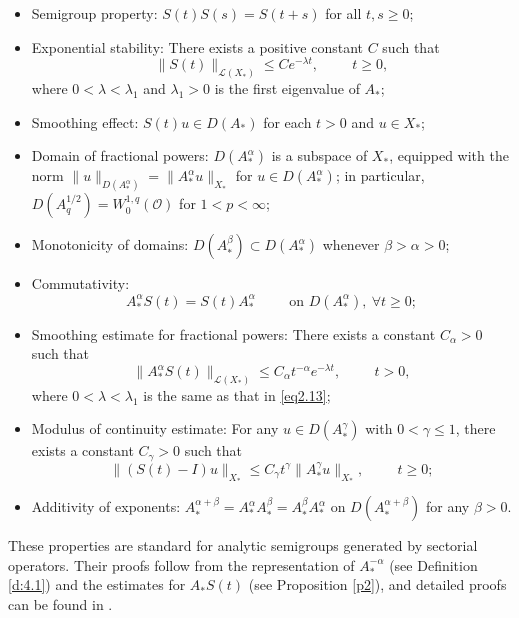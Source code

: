 \documentclass[10pt]{article}
\numberwithin{figure}{section}
\numberwithin{equation}{section}
\newcommand{\0}{{\theta}}
\def\lam{\lambda}
\def\Hs{\hspace{1cm}}\def\hs{\hspace{0.5cm}}
\begin{document}
\begin{itemize}
    \item Semigroup property: $S(t)S(s)=S(t+s)$ for all $t,s\ge 0$;
    \item Exponential stability: There exists a positive constant $C$ such that
    \begin{equation}\label{eq2.13}
    \|S(t)\|_{\mathcal{L}(X_*)}\le Ce^{-\lam t},\Hs t\ge0,
    \end{equation}
    where $0<\lam<\lam_1$ and $\lam_1>0$ is the first eigenvalue of $A_*$;
    \item Smoothing effect: $S(t)u\in D(A_*)$ for each $t>0$ and $u\in X_*$;
    \item Domain of fractional powers: $D(A_*^\alpha)$ is a subspace of $X_*$, equipped with the norm $\|u\|_{D(A_*^\alpha)}=\|A_*^\alpha u\|_{X_*}$ for $u\in D(A_*^\alpha)$; in particular, $D(A_q^{1/2})=W^{1,q}_0(\mathcal{O})$ for $1<p<\infty$;
    \item Monotonicity of domains: $D(A_*^\beta)\subset D(A_*^\alpha)$ whenever $\beta>\alpha>0$;
    \item Commutativity:
    $$
    A_*^\alpha S(t)=S(t)A_*^\alpha \Hs\text{on } D(A_*^\alpha),\ \forall t\ge0;
 $$
    \item Smoothing estimate for fractional powers: There exists a constant $C_\alpha>0$ such that
    \begin{equation}\label{eq2.11}
    \|A_*^\alpha S(t)\|_{\mathcal{L}(X_*)}\le C_\alpha t^{-\alpha}e^{-\lam t},\Hs t>0,
    \end{equation}
    where $0<\lam<\lam_1$ is the same as that in \eqref{eq2.13};
    \item Modulus of continuity estimate: For any $u\in D(A_*^\gamma)$ with $0<\gamma\le 1$, there exists a constant $C_\gamma>0$ such that
    \begin{equation}\label{eq2.12}
    \|(S(t)-I)u\|_{X_*}\le C_\gamma t^{\gamma}\|A_*^\gamma u\|_{X_*},\Hs t\ge0;
    \end{equation}
    \item Additivity of exponents: $A_*^{\alpha+\beta}=A_*^\alpha A_*^\beta=A_*^\beta A_*^\alpha$ on $D(A_*^{\alpha+\beta})$ for any $\beta>0$.
\end{itemize}

These properties are standard for analytic semigroups generated by sectorial operators. Their proofs follow from the representation of $A_*^{-\alpha}$ (see Definition \ref{d:4.1}) and the estimates for $A_*S(t)$ (see Proposition \ref{p2}), and detailed proofs can be found in \cite[Section 1.4]{D.H}.
\end{document}
